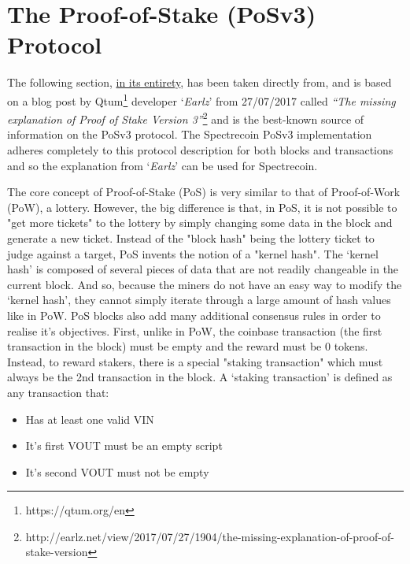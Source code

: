 \section{The Proof-of-Stake (PoSv3) Protocol}
The following section, \underline{in its entirety}, has been taken
directly from, and is based on a blog post by
Qtum\footnote{https://qtum.org/en} developer ‘\textit{Earlz}’
from 27/07/2017 called \textit{“The missing explanation of Proof
of Stake Version 3”}\footnote{http://earlz.net/view/2017/07/27/1904/the-missing-explanation-of-proof-of-stake-version}
and is the best-known source of information on the PoSv3 protocol.
The Spectrecoin PoSv3 implementation adheres completely to this protocol
description for both blocks and transactions and so the explanation from
‘\textit{Earlz}’ can be used for Spectrecoin.



The core concept of Proof-of-Stake (PoS) is very similar to that of
Proof-of-Work (PoW), a lottery. However, the big difference is that,
in PoS, it is not possible to "get more tickets" to the lottery by
simply changing some data in the block and generate a new ticket.
Instead of the "block hash" being the lottery ticket to judge against
a target, PoS invents the notion of a "kernel hash". The ‘kernel hash’
is composed of several pieces of data that are not readily changeable
in the current block. And so, because the miners do not have an easy
way to modify the ‘kernel hash’, they cannot simply iterate through a
large amount of hash values like in PoW. PoS blocks also add many
additional consensus rules in order to realise it's objectives. First,
unlike in PoW, the coinbase transaction (the first transaction in the
block) must be empty and the reward must be 0 tokens. Instead, to reward
stakers, there is a special "staking transaction" which must always be
the 2nd transaction in the block. A ‘staking transaction’ is defined as
any transaction that:


\begin{itemize}
	\item Has at least one valid VIN
	\item It's first VOUT must be an empty script
	\item It's second VOUT must not be empty
\end{itemize}



